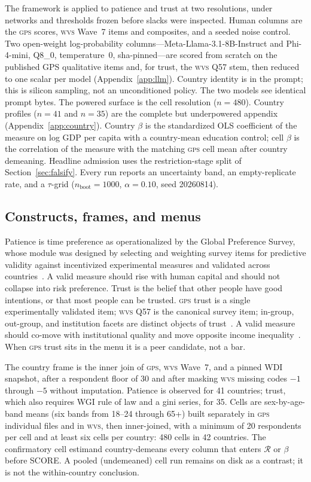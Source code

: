 \documentclass[10pt,letterpaper]{article}
\newcommand{\GPS}{\textsc{gps}}
\newcommand{\WVS}{\textsc{wvs}}
\newcommand{\Rset}{\mathcal{R}}
\begin{document}
The framework is applied to patience and trust at two resolutions, under networks and thresholds frozen before slacks were inspected.
Human columns are the \GPS{} scores, \WVS{} Wave~7 items and composites, and a seeded noise control.
Two open-weight log-probability columns---Meta-Llama-3.1-8B-Instruct and Phi-4-mini, Q8\_0, temperature~0, sha-pinned---are scored from scratch on the published GPS qualitative items and, for trust, the \WVS{} Q57 stem, then reduced to one scalar per model (Appendix~\ref{app:llm}).
Country identity is in the prompt; this is silicon sampling, not an unconditioned policy.
The two models see identical prompt bytes.
The powered surface is the cell resolution ($n=480$).
Country profiles ($n=41$ and $n=35$) are the complete but underpowered appendix (Appendix~\ref{app:country}).
Country $\beta$ is the standardized OLS coefficient of the measure on log GDP per capita with a country-mean education control; cell $\beta$ is the correlation of the measure with the matching \GPS{} cell mean after country demeaning.
Headline admission uses the restriction-stage split of Section~\ref{sec:falsify}.
Every run reports an uncertainty band, an empty-replicate rate, and a $\tau$-grid ($n_{\mathrm{boot}}=1000$, $\alpha=0.10$, seed 20260814).

\subsection{Constructs, frames, and menus}
\label{sec:app-construct}

Patience is time preference as operationalized by the Global Preference Survey, whose module was designed by selecting and weighting survey items for predictive validity against incentivized experimental measures and validated across countries~\cite{falk2018,falk2023}.
A valid measure should rise with human capital and should not collapse into risk preference.
Trust is the belief that other people have good intentions, or that most people can be trusted.
\GPS{} trust is a single experimentally validated item; \WVS{} Q57 is the canonical survey item; in-group, out-group, and institution facets are distinct objects of trust~\cite{glaser2000,sapienza2013}.
A valid measure should co-move with institutional quality and move opposite income inequality~\cite{aghion2010,bjornskov2008}.
When \GPS{} trust sits in the menu it is a peer candidate, not a bar.

The country frame is the inner join of \GPS{}, \WVS{} Wave~7, and a pinned WDI snapshot, after a respondent floor of 30 and after masking \WVS{} missing codes $-1$ through $-5$ without imputation.
Patience is observed for 41 countries; trust, which also requires WGI rule of law and a gini series, for 35.
Cells are sex-by-age-band means (six bands from 18--24 through 65+) built separately in \GPS{} individual files and in \WVS{}, then inner-joined, with a minimum of 20 respondents per cell and at least six cells per country: 480 cells in 42 countries.
The confirmatory cell estimand country-demeans every column that enters $\Rset$ or $\beta$ before SCORE.
A pooled (undemeaned) cell run remains on disk as a contrast; it is not the within-country conclusion.
\end{document}
